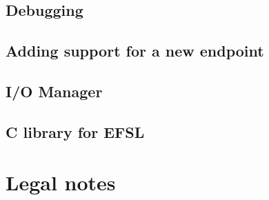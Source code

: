 \documentclass[a4paper,fleqn]{article}
\begin{document}
\subsection{Debugging}
	
\subsection{Adding support for a new endpoint}
	
\subsection{I/O Manager}
	
\subsection{C library for EFSL}
	

\newpage
\section{Legal notes}
	

%
%
\end{document}
